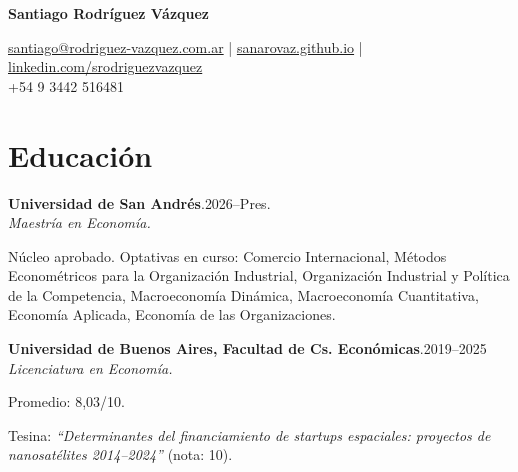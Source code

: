 \documentclass[11pt]{article}
\newcommand{\cvname}{Santiago Rodríguez Vázquez}
\newcommand{\entrydate}[1]{\hfill{\small{#1}}}
\begin{document}
\thispagestyle{firstpage}

{\LARGE\bfseries {\cvname}}

\href{mailto:santiago@rodriguez-vazquez.com.ar}{santiago@rodriguez-vazquez.com.ar} | \href{https://sanarovaz.github.io}{sanarovaz.github.io}
| \href{https://www.linkedin.com/in/srodriguezvazquez/}{linkedin.com/srodriguezvazquez}
\\
+54 9 3442 516481


\section{Educación}
\textbf{Universidad de San Andrés}.\entrydate{2026--Pres.}\\
\textit{Maestría en Economía.}
\begin{cvitems}
  \item Núcleo aprobado. Optativas en curso: Comercio Internacional,
  Métodos Econométricos para la Organización Industrial,
  Organización Industrial y Política de la Competencia,
  Macroeconomía Dinámica,
  Macroeconomía Cuantitativa,
  Economía Aplicada,
  Economía de las Organizaciones.
\end{cvitems}

\smallskip
\textbf{Universidad de Buenos Aires, Facultad de Cs. Económicas}.\entrydate{2019--2025}\\
\textit{Licenciatura en Economía.}
\begin{cvitems}
  \item Promedio: 8,03/10.
  \item Tesina: \emph{``Determinantes del financiamiento de startups espaciales:
        proyectos de nanosatélites 2014--2024''} (nota: 10).
\end{cvitems}

\end{document}
